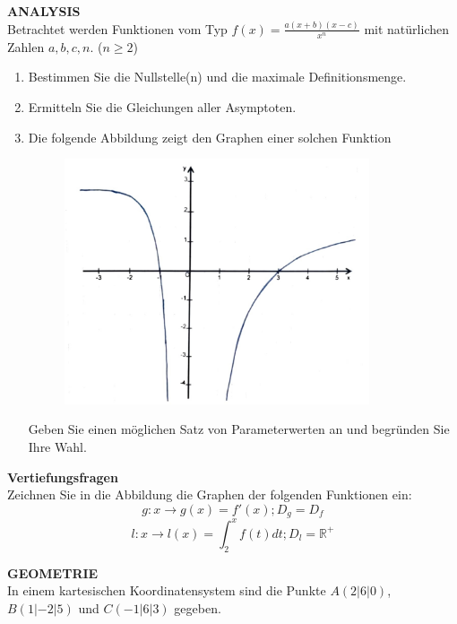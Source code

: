 \documentclass[a4paper,12pt]{article}
\begin{document}
{\bf ANALYSIS}\\

Betrachtet werden Funktionen vom Typ $f(x) = \frac{a(x+b)(x-c)}{x^n}$ mit natürlichen Zahlen $a, b, c, n$. ($n\ge2$)


\begin{enumerate}[label={\alph*)}]
  \item Bestimmen Sie die Nullstelle(n) und die maximale Definitionsmenge.
  \item Ermitteln Sie die Gleichungen aller Asymptoten.
  \item Die folgende Abbildung zeigt den Graphen einer solchen Funktion

\begin{figure}[ht!]
\centering
\includegraphics[width=90mm]{g1.jpg}
\end{figure}

Geben Sie einen möglichen Satz von Parameterwerten an und begründen Sie Ihre Wahl.
\end{enumerate}

{\bf Vertiefungsfragen}\\

Zeichnen Sie in die Abbildung die Graphen der folgenden Funktionen ein: 
\[ g:x \rightarrow g(x) = f'(x); D_g = D_f\]
\[ l:x \rightarrow l(x) = \int^{x}_{2}f(t)dt; D_l = {\mathbb{R}}^{+}\]


\newpage

{\bf GEOMETRIE}\\
In einem kartesischen Koordinatensystem sind die Punkte $A(2|6|0)$, $B(1|-2|5)$ und $C(-1|6|3)$ gegeben.
\end{document}
